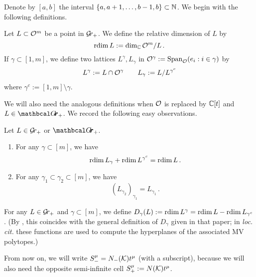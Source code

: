 \documentclass{article}
\begin{document}
Denote by $[a,b]$ the interval $\{a,a+1,\dots,b-1,b\}\subset\mathbb N$. We begin with the following definitions.
% 
\begin{definition}
Let $ L \subset \mathcal O^m$ be a point in $ \mathcal{G}\!r_+$.  We define the relative dimension of $L $ by
$$
    \operatorname{rdim} L := \dim_\mathbb C \mathcal O^m/L\,. 
$$
% 
If $ \gamma \subset [1,m]$, we define two lattices $ L^\gamma, L_\gamma $ in $ \mathcal O^\gamma := \operatorname{Span}_{\mathcal O}(e_i : i \in \gamma)$ by
\begin{gather*}
    L^\gamma:= L \cap \mathcal O^\gamma  \qquad L_\gamma := L / L^{\gamma^c} 
\end{gather*}
where $ \gamma^c := [1,m] \setminus \gamma$.
% 
\end{definition}
We will also need the analogous definitions when $ \mathcal O$ is replaced by $ \mathbb C[t]$ and $L \in \Grth_+$. 
% 
We record the following easy observations.
\begin{lemma}\label{le:rdimTrans} 
Let $ L \in \mathcal{G}\!r_+$ or $\Grth_+$.
\begin{enumerate}
    \item For any $ \gamma \subset [m] $, we have 
    $$ 
        \operatorname{rdim} L_\gamma + \operatorname{rdim} L^{\gamma^c} = \operatorname{rdim} L \,.
    $$
    \item For any $ \gamma_1 \subset \gamma_2 \subset [m]$, we have 
    $$ 
        (L_{\gamma_2})_{\gamma_1} = L_{\gamma_1}\,.
    $$
\end{enumerate}
\end{lemma}
% 
For any $ L \in \mathcal{G}\!r_+ $ and $\gamma \subset [m]$, we define $ D_\gamma(L) := \operatorname{rdim} L^\gamma = \operatorname{rdim} L - \operatorname{rdim} L_{\gamma^c}$. (By \cite[Proposition 9.3]{kamnitzer2010mirkovic}, this coincides with the general definition of $ D_\gamma$ given in that paper; in \textit{loc. cit.} these functions are used to compute the hyperplanes of the associated MV polytopes.) 

From now on, we will write $ S^\mu_- = N_-(\mathcal K) t^\mu$ (with a subscript), because we will also need the opposite semi-infinite cell $S^\mu_+ := N(\mathcal K)t^\mu$.
\end{document}
